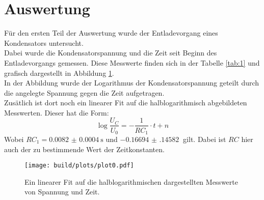 \section{Auswertung}
Für den ersten Teil der Auswertung wurde der Entladevorgang eines Kondensators untersucht.\\
Dabei wurde die Kondensatorspannung und die Zeit seit Beginn des Entladevorgangs gemessen.
Diese Messwerte finden sich in der Tabelle \ref{tab:1} und grafisch dargestellt in Abbildung \ref{img:1}.\\
In der Abbildung wurde der Logarithmus der Kondensatorspannung geteilt durch die angelegte Spannung gegen die Zeit aufgetragen.\\
Zusätlich ist dort noch ein linearer Fit auf die halblogarithmisch abgebildeten Messwerten. Dieser hat die Form:
\begin{equation*}
    \log{\frac{U_C}{U_0}}= -\frac{1}{RC_1}\cdot t +n
\end{equation*}
Wobei $RC_1= \SI{0.0082(4)}{\second}$ und $\SI{-0.16694(14582)}{}$ gilt. Dabei ist $RC$ hier auch der zu bestimmende Wert der Zeitkonstanten.

\begin{figure}[h]
    \centering
    \texttt{[image: build/plots/plot0.pdf]}
    \caption{Ein linearer Fit auf die halblogarithmischen dargestellten Messwerte von Spannung und Zeit.}
    \label{img:1}
\end{figure}

